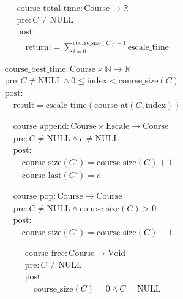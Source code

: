 \[
\begin{aligned}
&\text{course\_total\_time}: \text{Course} \to \mathbb{R} \\
&\text{pre}: C \neq \text{NULL} \\
&\text{post}: \\
&\quad \text{return:} = \sum_{i=0}^{\text{course\_size}(C)-1} \text{escale\_time}
\end{aligned}
\]





\[
\begin{aligned}
&\text{course\_best\_time}: \text{Course} \times \mathbb{N} \to \mathbb{R} \\
&\text{pre}: C \neq \text{NULL} \land 0 \leq \text{index} < \text{course\_size}(C) \\
&\text{post}: \\
&\quad \text{result} = \text{escale\_time}(\text{course\_at}(C, \text{index}))
\end{aligned}
\]





\[
\begin{aligned}
&\text{course\_append}: \text{Course} \times \text{Escale} \to \text{Course} \\
&\text{pre}: C \neq \text{NULL} \land e \neq \text{NULL} \\
&\text{post}: \\
&\quad \text{course\_size}(C') = \text{course\_size}(C) + 1 \\
&\quad \text{course\_last}(C') = e
\end{aligned}
\]





\[
\begin{aligned}
&\text{course\_pop}: \text{Course} \to \text{Course} \\
&\text{pre}: C \neq \text{NULL} \land \text{course\_size}(C) > 0 \\
&\text{post}: \\
&\quad \text{course\_size}(C') = \text{course\_size}(C) - 1
\end{aligned}
\]




\[
\begin{aligned}
&\text{course\_free}: \text{Course} \to \text{Void} \\
&\text{pre}: C \neq \text{NULL} \\
&\text{post}: \\
&\quad \text{course\_size}(C) = 0 \land C = \text{NULL}
\end{aligned}
\]


